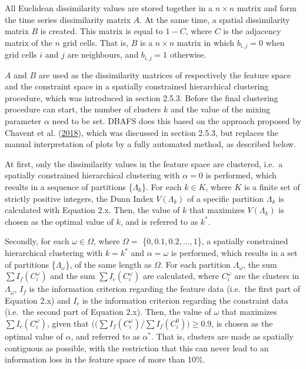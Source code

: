 \documentclass[12pt,oneside]{reedthesis}
\begin{document}
All Euclidean dissimilarity values are stored together in a
\(n \times n\) matrix and form the time series dissimilarity matrix
\(A\). At the same time, a spatial dissimilarity matrix \(B\) is
created. This matrix is equal to \(1-C\), where \(C\) is the adjacency
matrix of the \(n\) grid cells. That is, \(B\) is a \(n \times n\)
matrix in which \(b_{i,j} = 0\) when grid cells \(i\) and \(j\) are
neighbours, and \(b_{i,j} = 1\) otherwise.

\(A\) and \(B\) are used as the dissimilarity matrices of respectively
the feature space and the constraint space in a spatially constrained
hierarchical clustering procedure, which was introduced in section
2.5.3. Before the final clustering procedure can start, the number of
clusters \(k\) and the value of the mixing parameter \(\alpha\) need to
be set. DBAFS does this based on the approach proposed by Chavent et al.
(\protect\hyperlink{ref-clustgeo}{2018}), which was discussed in section
2.5.3, but replaces the manual interpretation of plots by a fully
automated method, as described below.

At first, only the dissimilarity values in the feature space are
clustered, i.e.~a spatially constrained hierarchical clustering with
\(\alpha = 0\) is performed, which results in a sequence of partitions
\{\(\Lambda_{k}\)\}. For each \(k \in K\), where \(K\) is a finite set
of strictly positive integers, the Dunn Index \(V(\Lambda_{k})\) of a
specific partition \(\Lambda_{k}\) is calculated with Equation 2.x.
Then, the value of \(k\) that maximizes \(V(\Lambda_{k})\) is chosen as
the optimal value of \(k\), and is referred to as \(k^{*}\).

Secondly, for each \(\omega \in \Omega\), where \(\Omega =\)
\{\(0, 0.1, 0.2, ..., 1\)\}, a spatially constrained hierarchical
clustering with \(k = k^{*}\) and \(\alpha = \omega\) is performed,
which results in a set of partitions \{\(\Lambda_{\omega}\)\}, of the
same length as \(\Omega\). For each partition \(\Lambda_{\omega}\), the
sum \(\sum I_{f}(C_{i}^{\omega})\) and the sum
\(\sum I_{c}(C_{i}^{\omega})\) are calculated, where \(C_{i}^{\omega}\)
are the clusters in \(\Lambda_{\omega}\), \(I_{f}\) is the information
criterion regarding the feature data (i.e.~the first part of Equation
2.x) and \(I_{c}\) is the information criterion regarding the constraint
data (i.e.~the second part of Equation 2.x). Then, the value of
\(\omega\) that maximizes \(\sum I_{c}(C_{i}^{\omega})\), given that
\(\big((\sum I_{f}(C_{i}^{\omega}) / \sum I_{f}(C_{i}^{0})\big) \geq 0.9\),
is chosen as the optimal value of \(\alpha\), and referred to as
\(\alpha^{*}\). That is, clusters are made as spatially contiguous as
possible, with the restriction that this can never lead to an
information loss in the feature space of more than 10\%.
\end{document}
